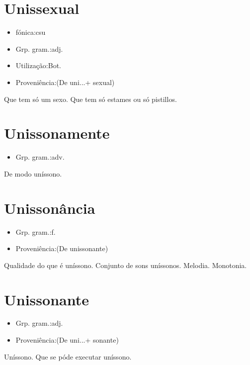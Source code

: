 \documentclass{article}
\begin{document}
\section{Unissexual}
\begin{itemize}
\item {fónica:csu}
\end{itemize}
\begin{itemize}
\item {Grp. gram.:adj.}
\end{itemize}
\begin{itemize}
\item {Utilização:Bot.}
\end{itemize}
\begin{itemize}
\item {Proveniência:(De \textunderscore uni...\textunderscore  + \textunderscore sexual\textunderscore )}
\end{itemize}
Que tem só um sexo.
Que tem só estames ou só pistillos.
\section{Unissonamente}
\begin{itemize}
\item {Grp. gram.:adv.}
\end{itemize}
De modo uníssono.
\section{Unissonância}
\begin{itemize}
\item {Grp. gram.:f.}
\end{itemize}
\begin{itemize}
\item {Proveniência:(De \textunderscore unissonante\textunderscore )}
\end{itemize}
Qualidade do que é uníssono.
Conjunto de sons uníssonos.
Melodia.
Monotonia.
\section{Unissonante}
\begin{itemize}
\item {Grp. gram.:adj.}
\end{itemize}
\begin{itemize}
\item {Proveniência:(De \textunderscore uni...\textunderscore  + \textunderscore sonante\textunderscore )}
\end{itemize}
Uníssono.
Que se póde executar uníssono.
\end{document}
